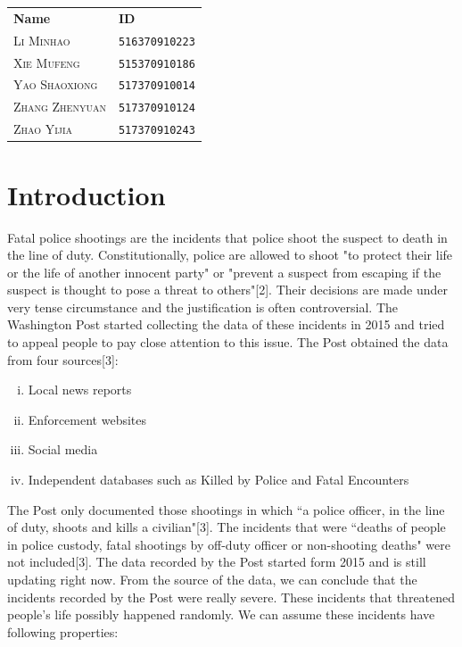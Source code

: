\documentclass[11pt,a4paper,english]{article}
\begin{document}
\begin{table}[h!]
\centering
\begin{tabular}{ll}
\textbf{Name} & \textbf{ID} \\
\textsc{Li Minhao} & \texttt{516370910223} \\
\textsc{Xie Mufeng} &  \texttt{515370910186} \\
\textsc{Yao Shaoxiong} & \texttt{517370910014} \\
\textsc{Zhang Zhenyuan} & \texttt{517370910124} \\
\textsc{Zhao Yijia} &  \texttt{517370910243} \\
\end{tabular}
\end{table}
\newpage
\begin{abstract}
\end{abstract}
\newpage
\tableofcontents
\newpage\section{Introduction}
Fatal police shootings are the incidents that police shoot the suspect to death in the line of duty. Constitutionally, police are allowed to shoot "to protect their life or the life of another innocent party" or "prevent a suspect from escaping if the suspect is thought to pose a threat to others"[2]. Their decisions are made under very tense circumstance and the justification is often controversial. The Washington Post started collecting the data of these incidents in 2015 and tried to appeal people to pay close attention to this issue. The Post obtained the data from four sources[3]: 
\begin{enumerate}[(i)]
    \item Local news reports
    \item Enforcement websites
    \item Social media
	\item Independent databases such as Killed by Police and Fatal Encounters
\end{enumerate}
The Post only documented those shootings in which ``a police officer, in the line of duty, shoots and kills a civilian"[3]. The incidents that were ``deaths of people in police custody, fatal shootings by off-duty officer or non-shooting deaths" were not included[3]. The data recorded by the Post started form 2015 and is still updating right now. From the source of the data, we can conclude that the incidents recorded by the Post were really severe. These incidents that threatened people's life possibly happened randomly. We can assume these incidents have following properties:
\end{document}
